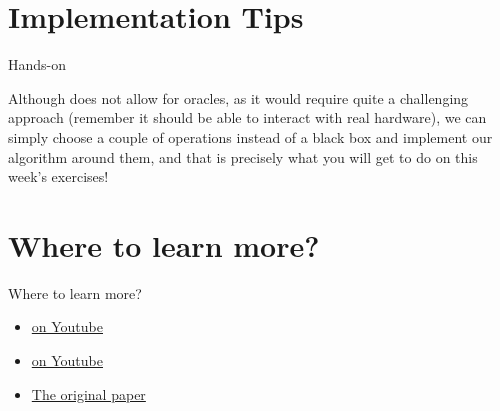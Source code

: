 \documentclass[aspectratio=43]{beamer}
\begin{document}
\section{Implementation Tips}
\begin{frame}{Hands-on}
\begin{card}
    Although \qk does not allow for oracles, as it would require quite a challenging approach (remember it should be able to interact with real hardware), we can simply choose a couple of operations instead of a black box and implement our \ds algorithm around them, and that is precisely what you will get to do on this week's exercises!
\end{card}
\pagenumber
\end{frame}


\section{Where to learn more?}
\begin{frame}{Where to learn more?}
\begin{card}
    \begin{itemize}
    \item \href{https://www.youtube.com/watch?v=mGqyzZ-fnnY}{\djs on Youtube}
    \item \href{https://www.youtube.com/watch?v=-f_VTELFXxU}{\ds on Youtube}
    \item \href{http://rspa.royalsocietypublishing.org/content/439/1907/553}{The original \djs paper}
    \end{itemize}
\end{card}
\end{frame}
\end{document}
